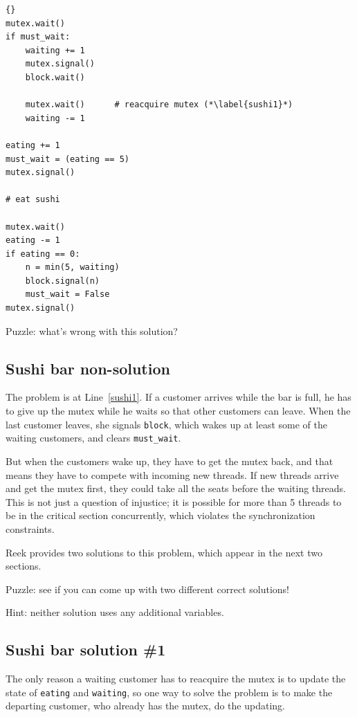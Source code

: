 \documentclass{book}
\newcommand{\clearemptydoublepage}{\newpage\cleardoublepage}
\begin{document}
\begin{latin}
\begin{lstlisting}[title={Sushi bar non-solution}]{}
mutex.wait()
if must_wait:
    waiting += 1
    mutex.signal()
    block.wait()

    mutex.wait()      # reacquire mutex (*\label{sushi1}*)
    waiting -= 1

eating += 1
must_wait = (eating == 5)
mutex.signal()

# eat sushi

mutex.wait()
eating -= 1
if eating == 0:
    n = min(5, waiting)
    block.signal(n)
    must_wait = False
mutex.signal()
\end{lstlisting}
\end{latin}

Puzzle: what's wrong with this solution?


\clearemptydoublepage
\subsection {Sushi bar non-solution}

The problem is at Line~\ref{sushi1}.  If a customer arrives
while the bar is full, he has to give up the mutex while he
waits so that other customers can leave.  When the last customer
leaves, she signals {\tt block}, which wakes up at least some
of the waiting customers, and clears {\tt must\_wait}.

But when the customers wake up, they have to get the mutex
back, and that means they have to compete with incoming new
threads.  If new threads arrive and get the mutex first,
they could take all the seats before the waiting threads.
This is not just a question of injustice; it is possible for more
than 5 threads to be in the critical section concurrently, which
violates the synchronization constraints.

Reek provides two solutions to this problem, which appear
in the next two sections.

Puzzle: see if you can come up with two different correct solutions!

Hint: neither solution uses any additional variables.

\clearemptydoublepage
\subsection {Sushi bar solution \#1}

The only reason a waiting customer has to reacquire the mutex
is to update the state of {\tt eating} and {\tt waiting}, so
one way to solve the problem is to make the departing customer,
who already has the mutex, do the updating.
\end{document}
